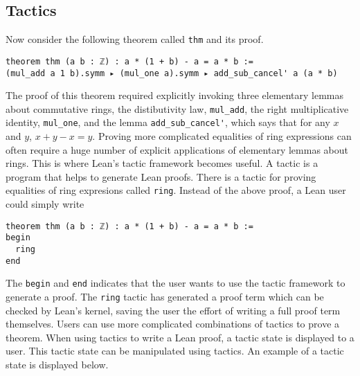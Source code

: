 \documentclass[12pt]{article} %
\theoremstyle{definition}
\theoremstyle{definition}
\theoremstyle{definition}
\theoremstyle{definition}
\theoremstyle{definition}
\theoremstyle{definition}
\begin{document}

\subsection{Tactics}

Now consider the following theorem called \lstinline{thm} and its proof.

\begin{lstlisting}
theorem thm (a b : ℤ) : a * (1 + b) - a = a * b :=
(mul_add a 1 b).symm ▸ (mul_one a).symm ▸ add_sub_cancel' a (a * b)
\end{lstlisting}

The proof of this theorem required explicitly invoking three elementary lemmas about commutative
rings, the distibutivity law, \lstinline{mul_add}, the right multiplicative identity,
\lstinline{mul_one}, and the lemma \lstinline{add_sub_cancel'},
which says that for any $x$ and $y$, $x + y - x = y$.
Proving more complicated equalities of ring expressions can often require a huge
number of explicit applications of elementary lemmas about rings. This is where Lean's
tactic framework becomes useful. A tactic is a program that helps to generate Lean proofs. There is
a tactic for proving equalities of ring expresions called \lstinline{ring}. Instead
of the above proof, a Lean user could simply write

\begin{lstlisting}
theorem thm (a b : ℤ) : a * (1 + b) - a = a * b :=
begin
  ring
end
\end{lstlisting}

The \lstinline{begin} and \lstinline{end} indicates that the user wants to use the tactic
framework to generate a proof. The \lstinline{ring} tactic has generated a proof term
which can be checked by Lean's kernel, saving the user the effort of writing a full proof
term themselves.
 Users can use more complicated combinations of tactics
to prove a theorem. When using tactics to write a Lean proof, a tactic state is displayed to a user.
This tactic state can be manipulated using tactics. An example of a tactic state is displayed
below.
\end{document}
